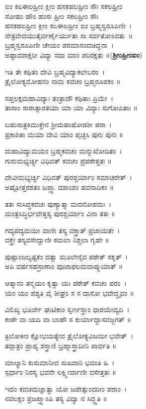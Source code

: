 ಐಂ ಕಏಈಲಹ್ರೀಂ ಕ್ಲೀಂ ಹಸಕಹಲಹ್ರೀಂ ಸೌಃ ಸಕಲಹ್ರೀಂ\\ಸೋಹಂ ಹೌಂ ಹಂಸಃ ಹ್ರೀಂ ಸಕಲಹ್ರೀಂ ಸೌಃ \\ ಹಸಕಹಲಹ್ರೀಂ ಕ್ಲೀಂ ಕಏಈಲಹ್ರೀಂ ಐಂ ಬ್ರಹ್ಮಸ್ವರೂಪಿಣೀ~।\\
ನೇತ್ರವೇದಯುತೈರ್ವರ್ಣೈರ್ಯುತಾ ಸಾ ಸರ್ವತೋಽವತು~॥\\
ಬ್ರಹ್ಮಸ್ವರೂಪಿಣೀ ಚೇಯಂ ಪರಮಾನಂದಚಿದ್ಘನಾ~।\\
ಅಷ್ಟಾದಶಾಕ್ಷರೀ ವಿದ್ಯಾ ಸದಾ ಮಾಂ ಪರಿರಕ್ಷತು ॥({\bfseries ಶ್ರೀಂಹ್ರೀಂಐಂ})

ಇತಿ ತೇ ಕಥಿತಂ ದೇವಿ ಬ್ರಹ್ಮವಿದ್ಯಾಕಲೇಬರಂ~।\\
ತ್ರೈಲೋಕ್ಯಮೋಹನಂ ನಾಮ ಕವಚಂ ಬ್ರಹ್ಮರೂಪಕಂ ॥

ಸಪ್ತಲಕ್ಷಮಹಾವಿದ್ಯಾಃ ತಂತ್ರಾದೌ ಕಥಿತಾಃ ಪ್ರಿಯೇ~।\\
ತಾಸಾಂ ಸಾರಾತ್ಸಾರತಯಾ ಯಾ ಯಾ ವಿದ್ಯಾಃ ಸುಗೋಪಿತಾಃ ॥

ಬಹುನಾತ್ರಕಿಮುಕ್ತೇನ ಶ್ರೀಮಹಾಷೋಡಶೀ ಪರಾ~।\\
ಪ್ರಕಾಶಿತಾ ಮಯಾ ದೇವಿ ಯಾಂ ಪೃಚ್ಛಸಿ ಪುನಃ ಪುನಃ ॥

ಮಹಾವಿದ್ಯಾಮಯಂ ಬ್ರಹ್ಮಕವಚಂ ಮನ್ಮುಖೋದಿತಂ~।\\
ಗುರುಮಭ್ಯರ್ಚ್ಯ ವಿಧಿವತ್ ಕವಚಂ ಪ್ರಪಠೇತ್ತತಃ ॥

ದೇವೀಮಭ್ಯರ್ಚ್ಯ ವಿಧಿವತ್ ಪುರಶ್ಚರ್ಯಾಂ ಸಮಾಚರೇತ್~।\\
ಅಷ್ಟೋತ್ತರಶತಂ ಜಪ್ತ್ವಾ ದಶಾಂಶಂ ಹವನಾದಿಕಂ ॥

ತತಃ ಸುಸಿದ್ಧಕವಚಃ ಪುಣ್ಯಾತ್ಮಾ ಮದನೋಪಮಃ~।\\
ಮಂತ್ರಸಿದ್ಧಿರ್ಭವೇತ್ತಸ್ಯ ಪುರಶ್ಚರ್ಯಾಂ ವಿನಾ ತತಃ ॥

ಗದ್ಯಪದ್ಯಮಯೀ ವಾಣೀ ತಸ್ಯ ವಕ್ತ್ರಾತ್ ಪ್ರಜಾಯತೇ~।\\
ವಕ್ತ್ರೇ ತಸ್ಯವಸೇದ್ವಾಣೀ ಕಮಲಾ ನಿಶ್ಚಲಾ ಗೃಹೇ ॥

ಪುಷ್ಪಾಂಜಲ್ಯಷ್ಟಕಂ ದತ್ವಾ ಮೂಲೇನೈವ ಪಠೇತ್ ಸಕೃತ್~।\\
ಅಪಿ ವರ್ಷಸಹಸ್ರಾಣಾಂ ಪೂಜಾಫಲಮವಾಪ್ನುಯಾತ್ ॥

ಆತ್ಮಾನಂ ತನ್ಮಯಂ ಕೃತ್ವಾ ಯಃ ಪಠೇತ್ ಕವಚಂ ಪರಂ~।\\
ಯಂ ಯಂ ಪಶ್ಯತಿ ವೈ ಶೀಘ್ರಂ ಸ ಸ ದಾಸೋ ಭವೇದ್ಧೃವಂ ॥

ವಿಲಿಖ್ಯ ಭೂರ್ಜೇ ಘುಟಿಕಾಂ ಸ್ವರ್ಣಸ್ಥಾಂ ಧಾರಯೇದ್ಯದಿ~।\\
ಕಂಠೇ ವಾ ಯದಿ ವಾ ಬಾಹೌ ಸ ಕುರ್ಯಾದ್ದಾಸವಜ್ಜಗತ್ ॥

ತ್ರಿಲೋಕೀಂ ಕ್ಷೋಭಯತ್ಯೇವ ತ್ರೈಲೋಕ್ಯವಿಜಯೀ ಭವೇತ್~।\\
ತದ್ಗಾತ್ರಂ ಪ್ರಾಪ್ಯ ಶಸ್ತ್ರಾಣಿ ಬ್ರಹ್ಮಾಸ್ತ್ರಾದೀನಿ ಪಾರ್ವತಿ ॥

ಮಾಲ್ಯಾನಿ ಕುಸುಮಾನೀವ ಸುಖದಾನಿ ಭವಂತಿ ಹಿ~।\\
ಸ್ಪರ್ಧಾಂ ನಿರಸ್ಯ ಭವನೇ ಲಕ್ಷ್ಮೀರ್ವಾಣೀ ವಸೇತ್ತತಃ ॥

ಇದಂ ಕವಚಮಜ್ಞಾತ್ವಾ ಯೋ ಜಪೇತ್ಸುಂದರೀಂ ಪರಾಂ~।\\
ನವಲಕ್ಷಂ ಪ್ರಜಪ್ತ್ವಾಽಪಿ ತಸ್ಯ ವಿದ್ಯಾ ನ ಸಿದ್ಧ್ಯತಿ ॥

